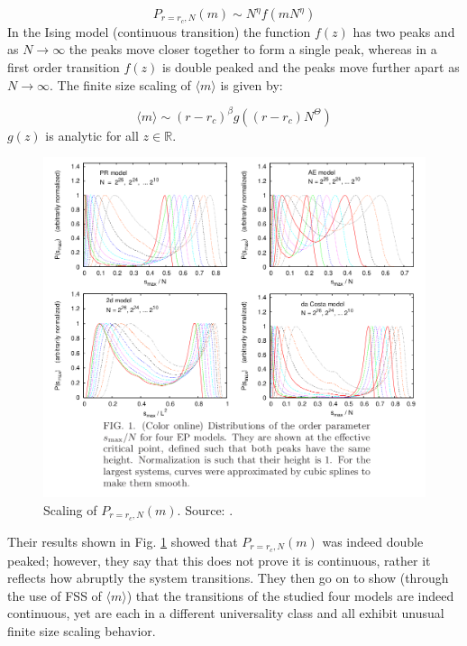 \begin{equation}
	P_{r=r_c, N}(m) \sim N^\eta f(m N^\eta)
\end{equation}
In the Ising model (continuous transition) the function $f(z)$ has two peaks and as $N \rightarrow \infty$ the peaks move closer together to form a single peak, whereas in a first order transition $f(z)$ is double peaked and the peaks move further apart as $N \rightarrow \infty$.
The finite size scaling of $\langle m \rangle$ is given by:

\begin{equation}
	\langle m \rangle \sim (r - r_c)^\beta g((r - r_c) N^\Theta)
\end{equation}
$g(z)$ is analytic for all $z \in \mathbb{R}$.

\begin{figure}[H]
	\centering
	\includegraphics[width=350pt]{images/grassberger_scaling.png}
	\caption{Scaling of $P_{r=r_c, N}(m)$. Source: \cite{Grassberger_1}.}
	\label{fig:grassberger_scaling}
\end{figure}

Their results shown in Fig. \ref{fig:grassberger_scaling} showed that $P_{r=r_c, N}(m)$ was indeed double peaked; however, they say that this does not prove it is continuous, rather it reflects how abruptly the system transitions.
They then go on to show (through the use of FSS of $\langle m \rangle$) that the transitions of the studied four models are indeed continuous, yet are each in a different universality class and all exhibit unusual finite size scaling behavior.



